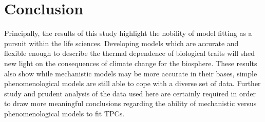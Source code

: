 \documentclass[11pt]{article}
\begin{document}
    \section{Conclusion}
        Principally, the results of this study highlight the nobility of model fitting as a pursuit within the life sciences. Developing models which are accurate and flexible enough to describe the thermal dependence of biological traits will shed new light on the consequences of climate change for the biosphere. These results also show while mechanistic models may be more accurate in their bases, simple phenomenological models are still able to cope with a diverse set of data. Further study and prudent analysis of the data used here are certainly required in order to draw more meaningful conclusions regarding the ability of mechanistic versus phenomenological models to fit TPCs.
    
    
\end{document}
